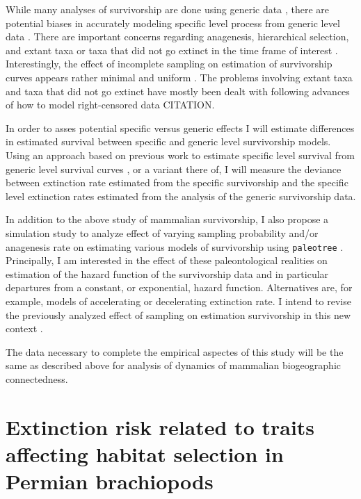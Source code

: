 \documentclass[12pt,letterpaper]{article}
\begin{document}

While many analyses of survivorship are done using generic data \citep{Tomiya2013,Liow2008,Harnik2013}, there are potential biases in accurately modeling specific level process from generic level data \citep{Raup1975,Sepkoski1975,Simpson2006,Raup1991a,VanValen1979}. There are important concerns regarding anagenesis, hierarchical selection, and extant taxa or taxa that did not go extinct in the time frame of interest \citep{Raup1975,VanValen1979,Simpson2006,Raup1991a}. Interestingly, the effect of incomplete sampling on estimation of survivorship curves appears rather minimal and uniform \citep{Sepkoski1975}. The problems involving extant taxa and taxa that did not go extinct have mostly been dealt with following advances of how to model right-censored data CITATION. 

In order to asses potential specific versus generic effects I will estimate differences in estimated survival between specific and generic level survivorship models. Using an approach based on previous work to estimate specific level survival from generic level survival curves \citep{Foote1988}, or a variant there of, I will measure the deviance between extinction rate estimated from the specific survivorship and the specific level extinction rates estimated from the analysis of the generic survivorship data. 

In addition to the above study of mammalian survivorship, I also propose a simulation study to analyze effect of varying sampling probability and/or anagenesis rate on estimating various models of survivorship using \texttt{paleotree} \citep{Bapst2012a}. Principally, I am interested in the effect of these paleontological realities on estimation of the hazard function of the survivorship data and in particular departures from a constant, or exponential, hazard function. Alternatives are, for example, models of accelerating or decelerating extinction rate. I intend to revise the previously analyzed effect of sampling on estimation survivorship in this new context \citep{Sepkoski1975}.

The data necessary to complete the empirical aspectes of this study will be the same as described above for analysis of dynamics of mammalian biogeographic connectedness.


\section{Extinction risk related to traits affecting habitat selection in Permian brachiopods}
\end{document}
